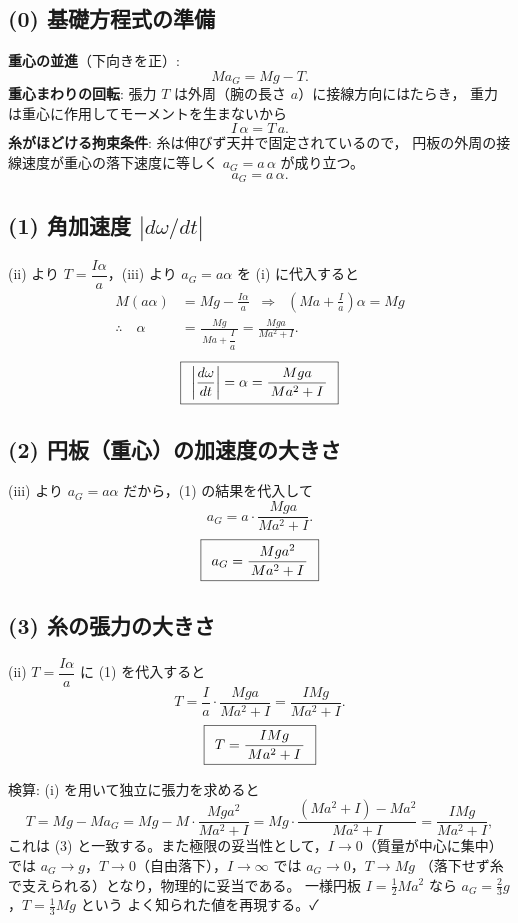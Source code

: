 \documentclass[11pt,a4paper]{article}
\begin{document}
\subsection*{(0) 基礎方程式の準備}
\textbf{重心の並進}（下向きを正）:
\[
  M a_{G}=Mg-T. \tag{i}
\]
\textbf{重心まわりの回転}: 張力 $T$ は外周（腕の長さ $a$）に接線方向にはたらき，
重力は重心に作用してモーメントを生まないから
\[
  I\,\alpha=T\,a. \tag{ii}
\]
\textbf{糸がほどける拘束条件}: 糸は伸びず天井で固定されているので，
円板の外周の接線速度が重心の落下速度に等しく $a_{G}=a\,\alpha$ が成り立つ。
\[
  a_{G}=a\,\alpha. \tag{iii}
\]

\subsection*{(1) 角加速度 $\left|d\omega/dt\right|$}
(ii) より $T=\dfrac{I\alpha}{a}$，(iii) より $a_{G}=a\alpha$ を (i) に代入すると
\begin{align*}
  M(a\alpha)&=Mg-\frac{I\alpha}{a}
  \;\;\Longrightarrow\;\;
  \left(Ma+\frac{I}{a}\right)\alpha=Mg\\
  \therefore\quad
  \alpha&=\frac{Mg}{\,Ma+\dfrac{I}{a}\,}=\frac{Mga}{Ma^{2}+I}.
\end{align*}
\[
  \boxed{\,\;\left|\dfrac{d\omega}{dt}\right|=\alpha=\dfrac{Mga}{\,Ma^{2}+I\,}\;\,}
\]

\subsection*{(2) 円板（重心）の加速度の大きさ}
(iii) より $a_{G}=a\alpha$ だから，(1) の結果を代入して
\[
  a_{G}=a\cdot\frac{Mga}{Ma^{2}+I}.
\]
\[
  \boxed{\,\;a_{G}=\dfrac{Mga^{2}}{\,Ma^{2}+I\,}\;\,}
\]

\subsection*{(3) 糸の張力の大きさ}
(ii) $T=\dfrac{I\alpha}{a}$ に (1) を代入すると
\[
  T=\frac{I}{a}\cdot\frac{Mga}{Ma^{2}+I}=\frac{IMg}{Ma^{2}+I}.
\]
\[
  \boxed{\,\;T=\dfrac{IMg}{\,Ma^{2}+I\,}\;\,}
\]

\medskip
検算: (i) を用いて独立に張力を求めると
\[
  T=Mg-Ma_{G}=Mg-M\cdot\frac{Mga^{2}}{Ma^{2}+I}
   =Mg\cdot\frac{(Ma^{2}+I)-Ma^{2}}{Ma^{2}+I}
   =\frac{IMg}{Ma^{2}+I},
\]
これは (3) と一致する。また極限の妥当性として，$I\to0$（質量が中心に集中）では
$a_{G}\to g$，$T\to0$（自由落下），$I\to\infty$ では $a_{G}\to0$，$T\to Mg$
（落下せず糸で支えられる）となり，物理的に妥当である。
一様円板 $I=\tfrac12 Ma^{2}$ なら $a_{G}=\tfrac{2}{3}g$，$T=\tfrac13 Mg$ という
よく知られた値を再現する。✓
\end{document}
